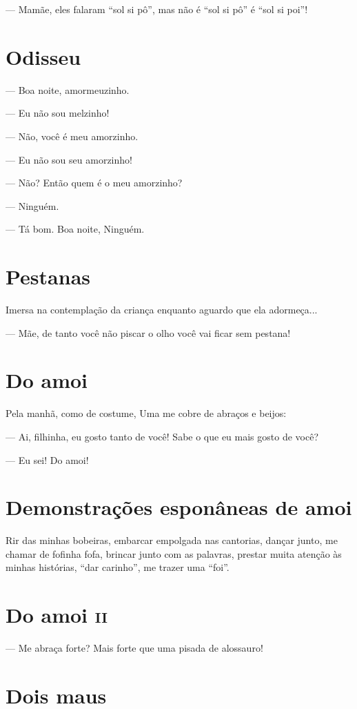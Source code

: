 {— Mamãe, eles falaram ``sol si pô'', mas não é ``sol si pô'' é ``sol si poi''!

\chapter{Odisseu}

— Boa noite, amormeuzinho.

— Eu não sou melzinho!

— Não, você é meu amorzinho.

— Eu não sou seu amorzinho!

— Não? Então quem é o meu amorzinho?

— Ninguém.

— Tá bom. Boa noite, Ninguém.

\chapter{Pestanas}

Imersa na contemplação da criança enquanto aguardo que ela adormeça...

— Mãe, de tanto você não piscar o olho você vai ficar sem pestana!

\chapter{Do amoi}

Pela manhã, como de costume, Uma me cobre de abraços e beijos:

— Ai, filhinha, eu gosto tanto de você! Sabe o que eu mais gosto de
você?

— Eu sei! Do amoi!

\chapter{Demonstrações esponâneas de amoi}

Rir das minhas bobeiras, embarcar empolgada nas cantorias, dançar junto,
me chamar de fofinha fofa, brincar junto com as palavras, prestar muita
atenção às minhas histórias, ``dar carinho'', me trazer uma ``foi''.

\chapter{Do amoi \textsc{ii}}

— Me abraça forte? Mais forte que uma pisada de alossauro!

\chapter{Dois maus}

}
